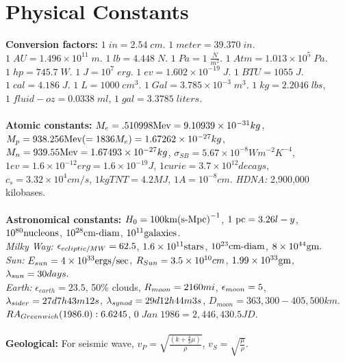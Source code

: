 \section{Physical Constants}
{\bf Conversion factors:}
$1 \; in= 2.54 \; cm$.
$1 \; meter= 39.370 \; in$.
$1 \; AU= 1.496 \times 10^{11}\; m$.
$1 \; lb= 4.448 \; N$.
$1 \; Pa= 1 \; {\frac {N} {m^2}}$.
$1 \; Atm= 1.013 \times 10^{5}\; Pa$.
$1 \; hp= 745.7 \; W$.
$1 \; J= 10^{7}\; erg$.
$1 \; ev= 1.602 \times 10^{-19}\; J$.
$1 \; BTU= 1055 \; J$.
$1 \; cal= 4.186\; J$.
$1 \; L= 1000 \; cm^3$.
$1 \; Gal= 3.785 \times 10^{-3}\; m^3$.
$1 \; kg = 2.2046 \; lbs$, $1 \; fluid-oz = 0.0338 \; ml$, 
$1 \; gal = 3.3785 \; liters$.
\\
\\
{\bf Atomic constants:} $M_{e} = .510998 \textnormal{Mev}= 9.10939 \times 10^{-31} kg$,
$M_{p} = 938.256 \textnormal{Mev} (=1836 M_{e})= 1.67262 \times 10^{-27}kg$,
$M_{n} = 939.55 \textnormal{Mev} = 1.67493 \times 10^{-27} kg$,
$\sigma_{SB} = 5.67 \times 10^{-8} W m^{-2} K^{-4}$,
$1 ev = 1.6 \times 10^{-12} erg = 1.6 \times 10^{-19} J$,
$1 curie = 3.7 \times 10^{12} decays$, $c_{s} = 3.32 \times 10^{4} cm/s$,
$1 kg TNT= 4.2 MJ$,
$1A = 10^{-8} cm$.  \emph{HDNA:} 2,900,000 kilobases.
\\
\\
{\bf Astronomical constants:} $H_{0} = 100 \textnormal{km{(s-Mpc)}}^{-1}$,
$1 \textnormal{ pc}= 3.26 l-y$,
$10^{80} \textnormal {nucleons}$, $10^{28} \textnormal{cm-diam}$, $10^{11} \textnormal{galaxies}$.
\\
\emph{Milky Way:} $\epsilon_{\small{ecliptic/MW}}= 62.5$,
$1.6 \times 10^{11} \textnormal{stars}$, $10^{23} \textnormal{cm-diam}$, $8 \times 10^{44} 
\textnormal{gm}.$ \\ \emph{Sun:} $E_{\small{sun}} = 4 \times 10^{33} 
\textnormal{ergs/sec}$,
$R_{\small{Su}n}= 3.5 \times 10^{10} cm$, $1.99 \times 10^{33} \textnormal{gm}$,
$\lambda_{\small{sun}} = 30 days.$ \\ \emph{Earth:} $\epsilon_{earth} =23.5$,
50\% clouds, $R_{
\small{moon}} = 2160 mi$, $\epsilon_{\small{moon}} = 5$, 
$\lambda_{\small{sider}} =  27d7h43m12s$, $\lambda_{
\small{synod}} = 29d12h44m3s$, $D_{moon}= 363,300 - 405,500 km$.
$RA_{\small{Greenwich}}  (1986.0): 6.6245$,
$ 0 \; Jan \; 1986= 2,446,430.5JD$.
\\
\\
{\bf Geological:}
For seismic wave,
$v_P= {\sqrt {\frac {(k+{\frac 4 3} \mu)} {\rho}}}$,
$v_S= {\sqrt {\frac {\mu} {\rho}}}$. \\
